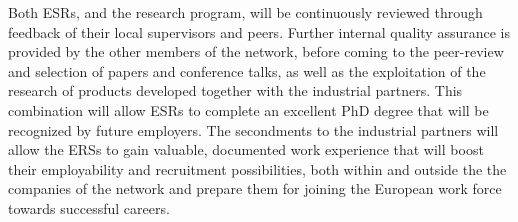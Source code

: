 \noindent\color{blue}{Quality Assurance. }\color{black}
Both ESRs, and the \acronym research program, will be continuously reviewed 
through feedback of their local supervisors and peers. Further internal quality assurance is
provided by the other members of the network, before coming to the peer-review
and selection of papers and conference talks, as well as the exploitation of the research
of products developed together with the industrial partners. 
This combination will allow \acronym ESRs to complete an excellent PhD degree 
that will be recognized by future employers. The secondments to the industrial partners will
allow the ERSs to gain valuable, documented work experience that will boost
their employability and recruitment possibilities, 
both within and outside the the companies of the network
and prepare them for joining the European work force towards successful careers. 

%
%


